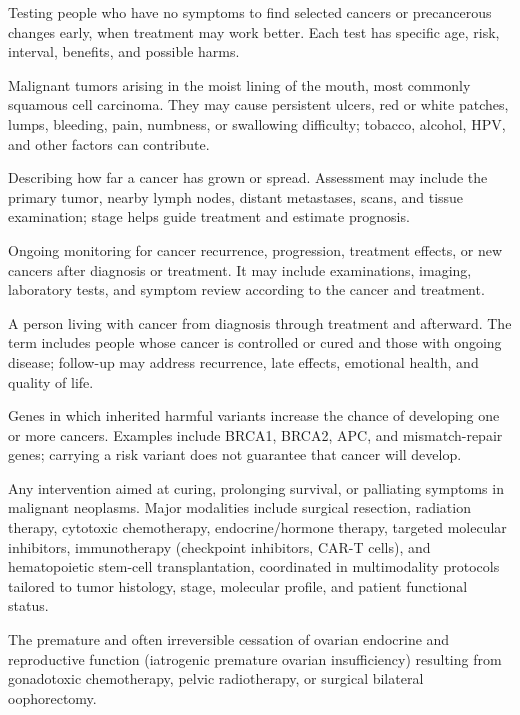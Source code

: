  Testing people who have no symptoms to find selected cancers or precancerous changes early, when treatment may work better. Each test has specific age, risk, interval, benefits, and possible harms.

 Malignant tumors arising in the moist lining of the mouth, most commonly squamous cell carcinoma. They may cause persistent ulcers, red or white patches, lumps, bleeding, pain, numbness, or swallowing difficulty; tobacco, alcohol, HPV, and other factors can contribute.

 Describing how far a cancer has grown or spread. Assessment may include the primary tumor, nearby lymph nodes, distant metastases, scans, and tissue examination; stage helps guide treatment and estimate prognosis.

 Ongoing monitoring for cancer recurrence, progression, treatment effects, or new cancers after diagnosis or treatment. It may include examinations, imaging, laboratory tests, and symptom review according to the cancer and treatment.

 A person living with cancer from diagnosis through treatment and afterward. The term includes people whose cancer is controlled or cured and those with ongoing disease; follow-up may address recurrence, late effects, emotional health, and quality of life.

 Genes in which inherited harmful variants increase the chance of developing one or more cancers. Examples include BRCA1, BRCA2, APC, and mismatch-repair genes; carrying a risk variant does not guarantee that cancer will develop.

 Any intervention aimed at curing, prolonging survival, or palliating symptoms in malignant neoplasms. Major modalities include surgical resection, radiation therapy, cytotoxic chemotherapy, endocrine/hormone therapy, targeted molecular inhibitors, immunotherapy (checkpoint inhibitors, CAR-T cells), and hematopoietic stem-cell transplantation, coordinated in multimodality protocols tailored to tumor histology, stage, molecular profile, and patient functional status.

 The premature and often irreversible cessation of ovarian endocrine and reproductive function (iatrogenic premature ovarian insufficiency) resulting from gonadotoxic chemotherapy, pelvic radiotherapy, or surgical bilateral oophorectomy.

